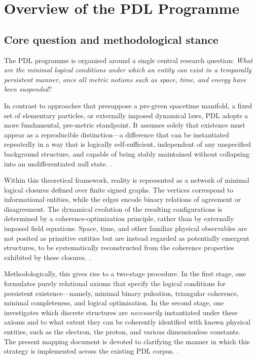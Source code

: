 \documentclass[11pt,a4paper]{article}
\begin{document}
\section{Overview of the PDL Programme}
\label{sec:overview}

\subsection{Core question and methodological stance}
\label{subsec:core_question}

The PDL programme is organised around a single central research question: \emph{What are the minimal logical conditions under which an entity can exist in a temporally persistent manner, once all metric notions such as space, time, and energy have been suspended}? \citep{PDL_Main_2026,PDL_intro}

In contrast to approaches that presuppose a pre-given spacetime manifold, a fixed set of elementary particles, or externally imposed dynamical laws, PDL adopts a more fundamental, pre-metric standpoint. It assumes solely that existence must appear as a reproducible distinction—a difference that can be instantiated repeatedly in a way that is logically self-sufficient, independent of any unspecified background structure, and capable of being stably maintained without collapsing into an undifferentiated null state.
\citep{PDL_Main_2026,PDL_position}.

Within this theoretical framework, reality is represented as a network of minimal logical closures defined over finite signed graphs. The vertices correspond to informational entities, while the edges encode binary relations of agreement or disagreement. The dynamical evolution of the resulting configurations is determined by a coherence-optimization principle, rather than by externally imposed field equations. Space, time, and other familiar physical observables are not posited as primitive entities but are instead regarded as potentially emergent structures, to be systematically reconstructed from the coherence properties exhibited by these closures.
\citep{PDL_Main_2026,PDL_intro}.

Methodologically, this gives rise to a two-stage procedure. In the first stage, one formulates purely relational axioms that specify the logical conditions for persistent existence—namely, minimal binary pulsation, triangular coherence, minimal completeness, and logical optimisation. In the second stage, one investigates which discrete structures are \emph{necessarily} instantiated under these axioms and to what extent they can be coherently identified with known physical entities, such as the electron, the proton, and various dimensionless constants. The present mapping document is devoted to clarifying the manner in which this strategy is implemented across the existing PDL corpus.
\citep{PDL_position}.
\end{document}

